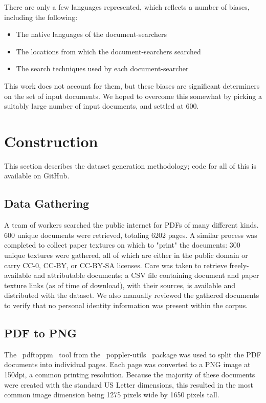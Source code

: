 \documentclass[runningheads]{llncs}
\begin{document}
There are only a few languages represented, which reflects a number of biases, including the following:
\begin{itemize}
\item The native languages of the document-searchers
\item The locations from which the document-searchers searched
\item The search techniques used by each document-searcher
\end{itemize}

This work does not account for them, but these biases are significant determiners on the set of input documents.
We hoped to overcome this somewhat by picking a suitably large number of input documents, and settled at 600.

\section{Construction}
This section describes the dataset generation methodology; code for all of this is available on GitHub.

\subsection{Data Gathering}
A team of workers searched the public internet for PDFs of many different kinds.
600 unique documents were retrieved, totaling 6202 pages.
A similar process was completed to collect paper textures on which to "print" the documents: 300 unique textures were gathered, all of which are either in the public domain or carry CC-0, CC-BY, or CC-BY-SA licenses.
Care was taken to retrieve freely-available and attributable documents; a CSV file containing document and paper texture links (as of time of download), with their sources, is available and distributed with the dataset.
We also manually reviewed the gathered documents to verify that no personal identity information was present within the corpus.

\subsection{PDF to PNG}
The ~pdftoppm~ tool from the ~poppler-utils~ package was used to split the PDF documents into individual pages.
Each page was converted to a PNG image at 150dpi, a common printing resolution.
Because the majority of these documents were created with the standard US Letter dimensions, this resulted in the most common image dimension being 1275 pixels wide by 1650 pixels tall.
\end{document}
